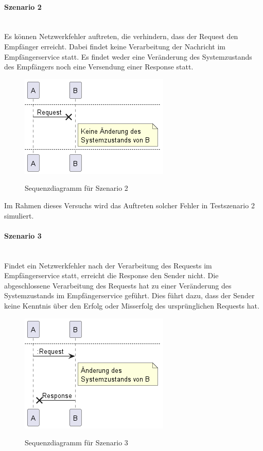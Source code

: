 \paragraph*{Szenario 2} \mbox{}\\
Es können Netzwerkfehler auftreten, die verhindern, dass der Request den Empfänger erreicht. Dabei findet keine Verarbeitung der Nachricht im Empfängerservice statt. Es findet weder eine Veränderung des Systemzustands des Empfängers noch eine Versendung einer Response statt.

\begin{figure}[H]
	\centering
	\includegraphics[width=.4\linewidth]{figures/ChapterVersuchsvorbereitung/TestSzenarien-1.png}
	\label{fig:Testszenario2}
	\caption{Sequenzdiagramm für Szenario 2}
\end{figure}
\FloatBarrier

Im Rahmen dieses Versuchs wird das Auftreten solcher Fehler in Testszenario 2 simuliert. 

\paragraph*{Szenario 3} \mbox{}\\
Findet ein Netzwerkfehler nach der Verarbeitung des Requests im Empfängerservice statt, erreicht die Response den Sender nicht. Die abgeschlossene Verarbeitung des Requests hat zu einer Veränderung des Systemzustands im Empfängerservice geführt. Dies führt dazu, dass der Sender keine Kenntnis über den Erfolg oder Misserfolg des ursprünglichen Requests hat.

\begin{figure}[H]
	\centering
	\includegraphics[width=.4\linewidth]{figures/ChapterVersuchsvorbereitung/TestSzenarien-2.png}
	\label{fig:Testszenario3}
	\caption{Sequenzdiagramm für Szenario 3}
\end{figure}
\FloatBarrier

